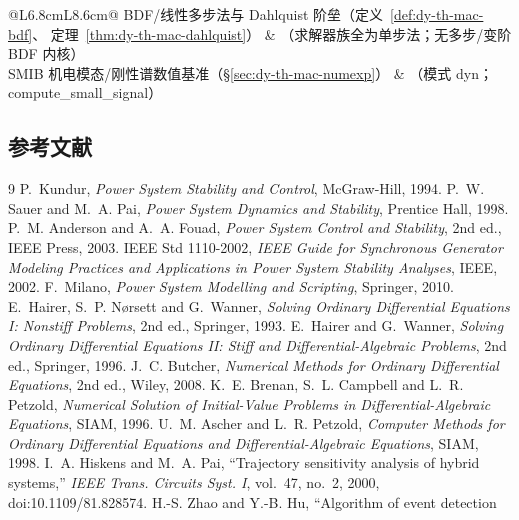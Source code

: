 \begin{center}
\begin{longtable}{@{}L{6.8cm}L{8.6cm}@{}}
BDF/线性多步法与 Dahlquist 阶垒（定义~\ref{def:dy-th-mac-bdf}、
定理~\ref{thm:dy-th-mac-dahlquist}） &
\implnone（求解器族全为单步法；无多步/变阶 BDF 内核）\\
SMIB 机电模态/刚性谱数值基准（§\ref{sec:dy-th-mac-numexp}） &
（模式 dyn；compute\_small\_signal）\\
\bottomrule
\end{longtable}
\end{center}

\subsection{参考文献}
{\renewcommand{\section}[2]{}%
\begin{thebibliography}{9}\small
{} P.~Kundur, \emph{Power System Stability and Control},
McGraw-Hill, 1994.
 P.~W. Sauer and M.~A. Pai, \emph{Power System Dynamics
and Stability}, Prentice Hall, 1998.
 P.~M. Anderson and A.~A. Fouad, \emph{Power System
Control and Stability}, 2nd ed., IEEE Press, 2003.
 IEEE Std 1110-2002, \emph{IEEE Guide for Synchronous
Generator Modeling Practices and Applications in Power System Stability Analyses},
IEEE, 2002.
 F.~Milano, \emph{Power System Modelling and Scripting},
Springer, 2010.
 E.~Hairer, S.~P. N{\o}rsett and G.~Wanner,
\emph{Solving Ordinary Differential Equations I: Nonstiff Problems}, 2nd ed.,
Springer, 1993.
 E.~Hairer and G.~Wanner, \emph{Solving Ordinary
Differential Equations II: Stiff and Differential-Algebraic Problems}, 2nd ed.,
Springer, 1996.
 J.~C. Butcher, \emph{Numerical Methods for Ordinary
Differential Equations}, 2nd ed., Wiley, 2008.
 K.~E. Brenan, S.~L. Campbell and L.~R. Petzold,
\emph{Numerical Solution of Initial-Value Problems in Differential-Algebraic
Equations}, SIAM, 1996.
 U.~M. Ascher and L.~R. Petzold, \emph{Computer
Methods for Ordinary Differential Equations and Differential-Algebraic Equations},
SIAM, 1998.
 I.~A. Hiskens and M.~A. Pai, ``Trajectory sensitivity
analysis of hybrid systems,'' \emph{IEEE Trans. Circuits Syst. I}, vol.~47,
no.~2, 2000, doi:10.1109/81.828574.
 H.-S. Zhao and Y.-B. Hu, ``Algorithm of event detection

\end{thebibliography}}
